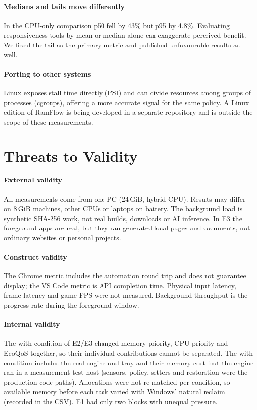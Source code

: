 \documentclass[11pt]{article}
\begin{document}
\paragraph{Medians and tails move differently}
In the CPU-only comparison p50 fell by 43\% but p95 by 4.8\%. Evaluating responsiveness tools by mean or median alone can exaggerate perceived benefit. We fixed the tail as the primary metric and published unfavourable results as well.

\paragraph{Porting to other systems}
Linux exposes stall time directly (PSI) and can divide resources among groups of processes (cgroups), offering a more accurate signal for the same policy. A Linux edition of RamFlow is being developed in a separate repository and is outside the scope of these measurements.

\section{Threats to Validity}
\label{sec:threats}

\paragraph{External validity}
All measurements come from one PC (24\,GiB, hybrid CPU). Results may differ on 8\,GiB machines, other CPUs or laptops on battery. The background load is synthetic SHA-256 work, not real builds, downloads or AI inference. In E3 the foreground apps are real, but they ran generated local pages and documents, not ordinary websites or personal projects.

\paragraph{Construct validity}
The Chrome metric includes the automation round trip and does not guarantee display; the VS Code metric is API completion time. Physical input latency, frame latency and game FPS were not measured. Background throughput is the progress rate during the foreground window.

\paragraph{Internal validity}
The with condition of E2/E3 changed memory priority, CPU priority and EcoQoS together, so their individual contributions cannot be separated. The with condition includes the real engine and tray and their memory cost, but the engine ran in a measurement test host (sensors, policy, setters and restoration were the production code paths). Allocations were not re-matched per condition, so available memory before each task varied with Windows' natural reclaim (recorded in the CSV). E1 had only two blocks with unequal pressure.
\end{document}
